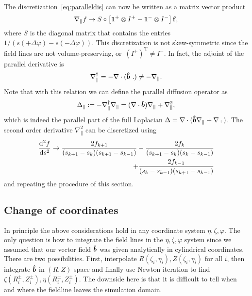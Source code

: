 The discretization~\eqref{eq:paralleldis} can now be written as a matrix vector product
\begin{align}
    \nabla_\parallel f \rightarrow S \circ \left[ \mathbf{1}^+\otimes I^+ - \mathbf{1}^- \otimes I^-  \right] {\mathbf{f}}, 
    \label{}
\end{align}
where $S$ is the diagonal matrix that contains the entries $1/(s(+\Delta\varphi) - s(-\Delta\varphi))$.
This discretization is not skew-symmetric since the
field lines are not volume-preserving, or~$(I^+)^\mathrm{T} \neq I^-$.
In fact, the adjoint of the parallel derivative is
\begin{align}
    \nabla_\parallel^\dagger = - \nabla\cdot(\bm{\hat{b}}\ . ) \neq -\nabla_\parallel.
    \label{}
\end{align}
Note that with this relation we can define the parallel 
diffusion operator as
\begin{align}
    \Delta_\parallel := -\nabla_\parallel^\dagger \nabla_\parallel = (\nabla\cdot \bm{\hat{b}}) \nabla_\parallel + \nabla_\parallel^2 , 
    \label{}
\end{align}
which is indeed the parallel part of the full Laplacian $\Delta = \nabla\cdot( \bm{\hat{b}} \nabla_\parallel + \nabla_\perp)$.
The second order derivative $\nabla_\parallel^2$ can be 
discretized using 
\begin{align}
    \frac{\mathrm{d}^2 f}{\mathrm{d} s^2} \rightarrow  
    \frac{2f_{k+1} }{(s_{k+1}-s_k)(s_{k+1}-s_{k-1})} -
    \frac{2f_k}{(s_{k+1}-s_k)(s_k - s_{k-1})} \nonumber\\ + 
    \frac{2f_{k-1} }{(s_{k}-s_{k-1})(s_{k+1}-s_{k-1})} 
    \label{}
\end{align}
and repeating the procedure of this section.
\subsection{Change of coordinates}
In principle the above considerations hold in any
coordinate system $\eta,\zeta,\varphi$.
The only question is how to integrate the field lines in the 
$\eta, \zeta,\varphi$ system 
since we assumed that our vector field $\bm{\hat{b}}$ was given 
analytically in 
cylindrical coordinates. There are two possibilities. 
First, interpolate $R(\zeta_i, \eta_i), Z(\zeta_i, \eta_i)$ for 
all $i$, then integrate $\bm{\hat{b}}$ in $(R,Z)$ space and finally use
Newton iteration to find $\zeta(R^\pm_i, Z^\pm_i), \eta(R^\pm_i, Z^\pm_i)$. 
The downside here is that it is difficult to tell when and where the fieldline leaves the simulation domain.

